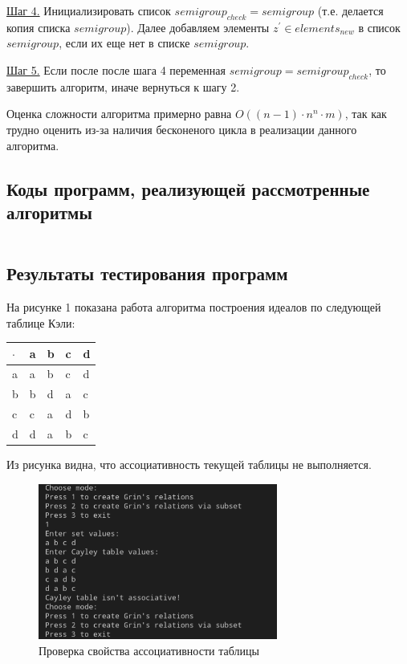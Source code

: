 \documentclass[bachelor, och, labwork]{shiza}
\begin{document}
      \underline{Шаг 4.} Инициализировать список $semigroup_{check} = semigroup$ (т.е. делается копия списка $semigroup$). Далее добавляем
      элементы $z^{'} \in elements_{new}$ в список $semigroup$, если их еще нет в списке $semigroup$. 

      \underline{Шаг 5.} Если после после шага 4 переменная $semigroup = semigroup_{check}$, то завершить алгоритм, иначе вернуться к шагу 2.

      Оценка сложности алгоритма примерно равна $O((n - 1) \cdot n^n \cdot m)$, так как трудно оценить из-за наличия бесконеного цикла в реализации
      данного алгоритма.

      \subsection{Коды программ, реализующей рассмотренные алгоритмы}

        \inputminted[fontsize=\small]{python}{code/aua-lab5.py}

        \newpage
      
      \subsection{Результаты тестирования программ}
      
      На рисунке 1 показана работа алгоритма построения идеалов по следующей таблице Кэли:

      \begin{table}[H]
        \centering
        \begin{tabular}{|l|l|l|l|l|}
        \hline
        $\cdot$ & a & b & c & d \\ \hline
        a & a & b & c & d \\ \hline
        b & b & d & a & c \\ \hline
        c & c & a & d & b \\ \hline
        d & d & a & b & c \\ \hline
    \end{tabular}
    \end{table}

      Из рисунка видна, что ассоциативность текущей таблицы не выполняется.

      \begin{figure}[H]
        \centering
        \includegraphics[width=0.7\textwidth]{photo/1.png}
        \caption{Проверка свойства ассоциативности таблицы}
      \end{figure}
\end{document}
